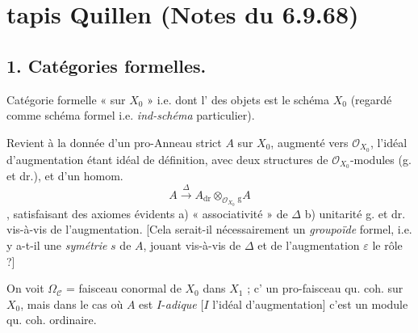 \documentclass[11pt,a4paper]{article}
\begin{document}

\section*{tapis Quillen (Notes du 6.9.68)}


\subsection*{1. Catégories formelles.}

Catégorie formelle  « sur $X_0$ » i.e. dont
l' des objets est le schéma $X_0$ (regardé comme
\struck{\ill{}} schéma formel i.e. \emph{ind-schéma} particulier).


Revient à la donnée d'un pro-Anneau strict  $A$ sur
$X_0$, augmenté vers $\mathcal{O}_{X_0}$, l'idéal d'augmentation étant idéal de
définition, avec deux structures  de
$\mathcal{O}_{X_0}$-modules (g. et dr.), et d'un homom.
\[
A \xrightarrow{\ \Delta\ } A_{\mathrm{dr}} \otimes_{\mathcal{O}_{X_0}} {}_{\mathrm{g}}A
\]
\struck{\ill{}}, satisfaisant des axiomes évidents a) « associativité » de
$\Delta$ b) unitarité g. et dr. vis-à-vis de l'augmentation. [Cela
serait-il nécessairement un  \emph{groupoïde} formel, i.e.
y a-t-il une \emph{symétrie} $s$ de $A$, jouant vis-à-vis de $\Delta$ et de
l'augmentation $\varepsilon$ le rôle  ?]

On voit $\Omega_{\mathcal{C}}$ = faisceau conormal de $X_0$ dans $X_1$ ;
c'  un pro-faisceau qu. coh. sur $X_0$,
mais dans le cas où $A$ est $I$-\emph{adique} [$I$ l'idéal
d'augmentation] c'est un module qu. coh. ordinaire.
\end{document}
